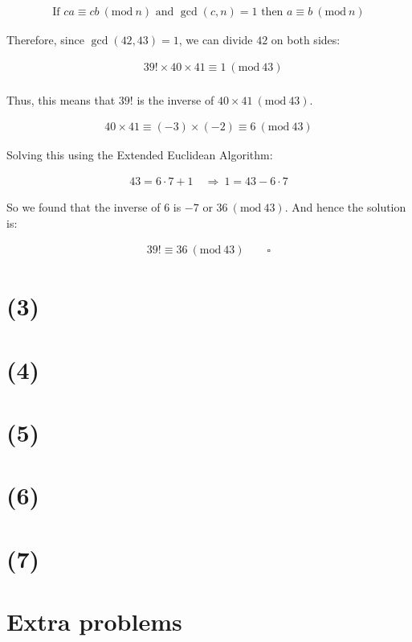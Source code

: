 \documentclass{article}
\newcommand{\modwos}[1]{\ (\mathrm{mod}\ #1)}
\begin{document}
\begin{align*}
    \text{If } ca \equiv cb \modwos{n} \text{ and } \gcd(c, n) = 1 \text{ then } a \equiv b \modwos{n}
\end{align*}

Therefore, since $\gcd(42, 43) = 1$, we can divide $42$ on both sides:

\begin{align*}
    &39! \times 40 \times 41 \equiv 1 \modwos{43} \\
\end{align*}

Thus, this means that $39!$ is the inverse of $40 \times 41 \modwos{43}$.

\begin{align*}
    40 \times 41 \equiv (-3) \times (-2) \equiv 6 \modwos{43}
\end{align*}


Solving this using the Extended Euclidean Algorithm:

\begin{align*}
    43 = 6 \cdot 7 + 1 \quad \Rightarrow \ 1 = 43 - 6 \cdot 7 
\end{align*}

So we found that the inverse of $6$ is $-7$ or $36 \modwos{43}$. And hence the solution is:

\begin{align*}
    39! \equiv 36 \modwos{43} \qquad \square
\end{align*}


\section*{(3)}

\section*{(4)}

\section*{(5)}

\section*{(6)}

\section*{(7)}

\section*{Extra problems}
\end{document}
